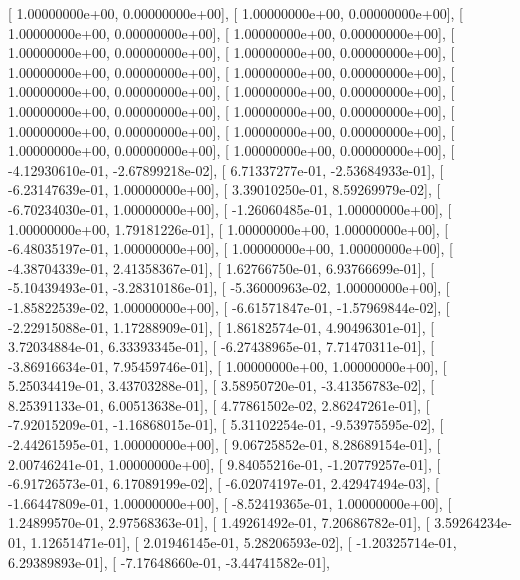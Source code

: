 \documentclass{article}
\begin{document}
       [  1.00000000e+00,   0.00000000e+00],
       [  1.00000000e+00,   0.00000000e+00],
       [  1.00000000e+00,   0.00000000e+00],
       [  1.00000000e+00,   0.00000000e+00],
       [  1.00000000e+00,   0.00000000e+00],
       [  1.00000000e+00,   0.00000000e+00],
       [  1.00000000e+00,   0.00000000e+00],
       [  1.00000000e+00,   0.00000000e+00],
       [  1.00000000e+00,   0.00000000e+00],
       [  1.00000000e+00,   0.00000000e+00],
       [  1.00000000e+00,   0.00000000e+00],
       [  1.00000000e+00,   0.00000000e+00],
       [  1.00000000e+00,   0.00000000e+00],
       [  1.00000000e+00,   0.00000000e+00],
       [  1.00000000e+00,   0.00000000e+00],
       [  1.00000000e+00,   0.00000000e+00],
       [ -4.12930610e-01,  -2.67899218e-02],
       [  6.71337277e-01,  -2.53684933e-01],
       [ -6.23147639e-01,   1.00000000e+00],
       [  3.39010250e-01,   8.59269979e-02],
       [ -6.70234030e-01,   1.00000000e+00],
       [ -1.26060485e-01,   1.00000000e+00],
       [  1.00000000e+00,   1.79181226e-01],
       [  1.00000000e+00,   1.00000000e+00],
       [ -6.48035197e-01,   1.00000000e+00],
       [  1.00000000e+00,   1.00000000e+00],
       [ -4.38704339e-01,   2.41358367e-01],
       [  1.62766750e-01,   6.93766699e-01],
       [ -5.10439493e-01,  -3.28310186e-01],
       [ -5.36000963e-02,   1.00000000e+00],
       [ -1.85822539e-02,   1.00000000e+00],
       [ -6.61571847e-01,  -1.57969844e-02],
       [ -2.22915088e-01,   1.17288909e-01],
       [  1.86182574e-01,   4.90496301e-01],
       [  3.72034884e-01,   6.33393345e-01],
       [ -6.27438965e-01,   7.71470311e-01],
       [ -3.86916634e-01,   7.95459746e-01],
       [  1.00000000e+00,   1.00000000e+00],
       [  5.25034419e-01,   3.43703288e-01],
       [  3.58950720e-01,  -3.41356783e-02],
       [  8.25391133e-01,   6.00513638e-01],
       [  4.77861502e-02,   2.86247261e-01],
       [ -7.92015209e-01,  -1.16868015e-01],
       [  5.31102254e-01,  -9.53975595e-02],
       [ -2.44261595e-01,   1.00000000e+00],
       [  9.06725852e-01,   8.28689154e-01],
       [  2.00746241e-01,   1.00000000e+00],
       [  9.84055216e-01,  -1.20779257e-01],
       [ -6.91726573e-01,   6.17089199e-02],
       [ -6.02074197e-01,   2.42947494e-03],
       [ -1.66447809e-01,   1.00000000e+00],
       [ -8.52419365e-01,   1.00000000e+00],
       [  1.24899570e-01,   2.97568363e-01],
       [  1.49261492e-01,   7.20686782e-01],
       [  3.59264234e-01,   1.12651471e-01],
       [  2.01946145e-01,   5.28206593e-02],
       [ -1.20325714e-01,   6.29389893e-01],
       [ -7.17648660e-01,  -3.44741582e-01],
\end{document}
